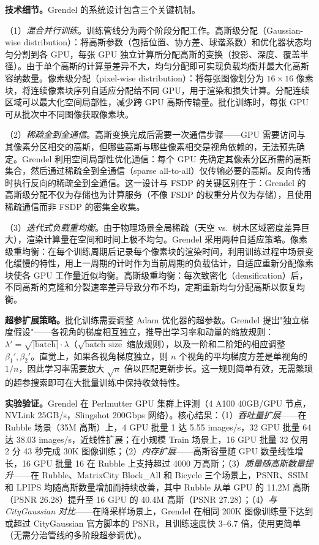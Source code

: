 \textbf{技术细节。}Grendel 的系统设计包含三个关键机制。

（1）\textit{混合并行训练}。训练管线分为两个阶段分配工作。高斯级分配（Gaussian-wise distribution）：将高斯参数（包括位置、协方差、球谐系数）和优化器状态均匀分割到各 GPU，每张 GPU 独立计算所分配高斯的变换（投影、深度、覆盖半径）。由于单个高斯的计算量差异不大，均匀分配即可实现负载均衡并最大化高斯容纳数量。像素级分配（pixel-wise distribution）：将每张图像划分为 $16 \times 16$ 像素块，将连续像素块序列自适应分配给不同 GPU，用于渲染和损失计算。分配连续区域可以最大化空间局部性，减少跨 GPU 高斯传输量。批化训练时，每张 GPU 可从批次中不同图像获取像素块。

（2）\textit{稀疏全到全通信}。高斯变换完成后需要一次通信步骤——GPU 需要访问与其像素分区相交的高斯，但哪些高斯与哪些像素相交是视角依赖的，无法预先确定。Grendel 利用空间局部性优化通信：每个 GPU 先确定其像素分区所需的高斯集合，然后通过稀疏全到全通信（sparse all-to-all）仅传输必要的高斯。反向传播时执行反向的稀疏全到全通信。这一设计与 FSDP 的关键区别在于：Grendel 的高斯级分配不仅为存储也为计算服务（不像 FSDP 的权重分片仅为存储），且使用稀疏通信而非 FSDP 的密集全收集。

（3）\textit{迭代式负载重均衡}。由于物理场景全局稀疏（天空 vs.\ 树木区域密度差异巨大），渲染计算量在空间和时间上极不均匀。Grendel 采用两种自适应策略。像素级重均衡：在每个训练周期后记录每个像素块的渲染时间，利用训练过程中场景变化缓慢的特性，用上一周期的计时作为当前周期的负载估计，自适应重新分配像素块使各 GPU 工作量近似均衡。高斯级重均衡：每次致密化（densification）后，不同高斯的克隆和分裂速率差异导致分布不均，定期重新均匀分配高斯以恢复均衡。

\textbf{超参扩展策略。}批化训练需要调整 Adam 优化器的超参数。Grendel 提出"独立梯度假设"——各视角的梯度相互独立，推导出学习率和动量的缩放规则：$\lambda' = \sqrt{|\text{batch}|} \cdot \lambda$（$\sqrt{\text{batch size}}$ 缩放规则），以及一阶和二阶矩的相应调整 $\beta_1', \beta_2'$。直觉上，如果各视角梯度独立，则 $n$ 个视角的平均梯度方差是单视角的 $1/n$，因此学习率需要放大 $\sqrt{n}$ 倍以匹配更新步长。这一规则简单有效，无需繁琐的超参搜索即可在大批量训练中保持收敛特性。

\textbf{实验验证。}Grendel 在 Perlmutter GPU 集群上评测（4 A100 40GB/GPU 节点，NVLink 25GB/s，Slingshot 200Gbps 网络）。核心结果：（1）\textit{吞吐量扩展}——在 Rubble 场景（35M 高斯）上，4 GPU 批量 1 达 5.55 images/s，32 GPU 批量 64 达 38.03 images/s，近线性扩展；在小规模 Train 场景上，16 GPU 批量 32 仅用 2 分 43 秒完成 30K 图像训练；（2）\textit{内存扩展}——高斯容量随 GPU 数量线性增长，16 GPU 批量 16 在 Rubble 上支持超过 4000 万高斯；（3）\textit{质量随高斯数量提升}——在 Rubble、MatrixCity Block\_All 和 Bicycle 三个场景上，PSNR、SSIM 和 LPIPS 均随高斯数量增加而持续改善，其中 Rubble 从单 GPU 的 11.2M 高斯（PSNR 26.28）提升至 16 GPU 的 40.4M 高斯（PSNR 27.28）；（4）\textit{与 CityGaussian 对比}——在降采样场景上，Grendel 在相同 200K 图像训练量下达到或超过 CityGaussian 官方脚本的 PSNR，且训练速度快 3--6.7 倍，使用更简单（无需分治管线的多阶段超参调优）。

